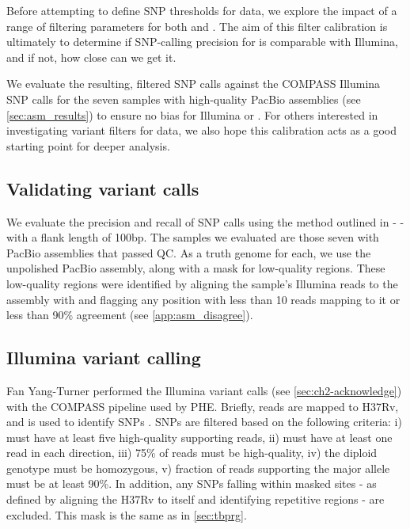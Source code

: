 Before attempting to define SNP thresholds for \ont{} data, we explore the impact of a range of filtering parameters for both \bcftools{} and \pandora{}. The aim of this filter calibration is ultimately to determine if SNP-calling precision for \ont{} is comparable with Illumina, and if not, how close can we get it.

We evaluate the resulting, filtered SNP calls against the COMPASS Illumina SNP calls for the seven samples with high-quality PacBio assemblies (see \autoref{sec:asm_results}) to ensure no bias for Illumina or \ont{}. For others interested in investigating variant filters for \ont{} data, we also hope this calibration acts as a good starting point for deeper analysis.

\subsection{Validating variant calls}
\label{sec:validate-var-calls}

We evaluate the precision and recall of SNP calls using the method outlined in  -  - with a flank length of 100bp. The samples we evaluated are those seven with PacBio assemblies that passed QC. As a truth genome for each, we use the unpolished \flye{} PacBio assembly, along with a mask for low-quality regions. These low-quality regions were identified by aligning the sample's Illumina reads to the assembly with  and flagging any position with less than 10 reads mapping to it or less than 90\% agreement (see \autoref{app:asm_disagree}). 

\subsection{Illumina variant calling}
\label{sec:illumina-var-call}

Fan Yang-Turner performed the Illumina variant calls (see \autoref{sec:ch2-acknowledge}) with the COMPASS pipeline used by PHE. Briefly, reads are mapped to H37Rv, and  is used to identify SNPs \cite{samtools2009}. SNPs are filtered based on the following criteria: i) must have at least five high-quality supporting reads, ii) must have at least one read in each direction, iii) 75\% of reads must be high-quality, iv) the diploid genotype must be homozygous, v) fraction of reads supporting the major allele must be at least 90\%. In addition, any SNPs falling within masked sites - as defined by aligning the H37Rv to itself and identifying repetitive regions \cite{tbmask2014} - are excluded. This mask is the same as in \autoref{sec:tbprg}.


